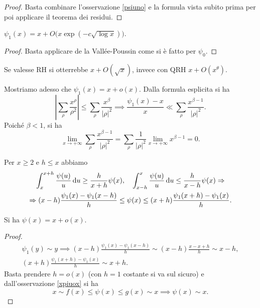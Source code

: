 \begin{proof}
  Basta combinare l'osservazione \ref{psiuno} e la formula vista subito prima per poi applicare il teorema dei residui.
\end{proof}

\begin{cor}
  $\psi_1(x)=x+O\big(x\exp(-c\sqrt{\log{x}})\big)$.
\end{cor}

\begin{proof}
  Basta applicare de la Vallée-Poussin come si è fatto per $\psi_0$.
\end{proof}

Se valesse RH si otterrebbe $x+O(\sqrt{x})$, invece con QRH $x+O(x^{\theta})$.

Mostriamo adesso che $\psi_1(x)=x+o(x)$. Dalla formula esplicita si ha
$$\left|\sum_{\rho} \frac{x^{\rho}}{\rho^2}\right| \le \sum_{\rho} \frac{x^{\beta}}{|\rho|^2} \implies \frac{\psi_1(x)-x}{x} \ll \sum_{\rho} \frac{x^{\beta-1}}{|\rho|^2}.$$
Poiché $\beta<1$, si ha
$$\lim_{x \longrightarrow +\infty} \sum_{\rho} \frac{x^{\beta-1}}{|\rho|^2}=\sum_{\rho} \frac{1}{|\rho|^2} \lim_{x \longrightarrow +\infty} x^{\beta-1}=0.$$

\begin{oss} \label{xpiuox}
  Per $x \ge 2$ e $h \le x$ abbiamo
  \begin{gather*}
    \int_x^{x+h} \frac{\psi(u)}{u}\mathop{}\!\mathrm{d} u \ge \frac{h}{x+h}\psi(x), \quad \int_{x-h}^x \frac{\psi(u)}{u}\mathop{}\!\mathrm{d} u \le \frac{h}{x-h}\psi(x) \Rightarrow \\
    \Rightarrow (x-h)\frac{\psi_1(x)-\psi_1(x-h)}{h} \le \psi(x) \le (x+h)\frac{\psi_1(x+h)-\psi_1(x)}{h}.
  \end{gather*}
\end{oss}

\begin{prop}
  Si ha $\psi(x)=x+o(x)$.
\end{prop}

\begin{proof}
  \begin{gather*}
    \psi_1(y) \sim y \implies (x-h)\frac{\psi_1(x)-\psi_1(x-h)}{h} \sim (x-h)\frac{x-x+h}{h}\sim x-h, \\
    (x+h)\frac{\psi_1(x+h)-\psi_1(x)}{h} \sim x+h.
  \end{gather*}
  Basta prendere $h=o(x)$ (con $h=1$ costante si va sul sicuro) e dall'osservazione \ref{xpiuox} si ha
  $$x \sim f(x) \le \psi(x) \le g(x) \sim x \implies \psi(x) \sim x.$$
\end{proof}

